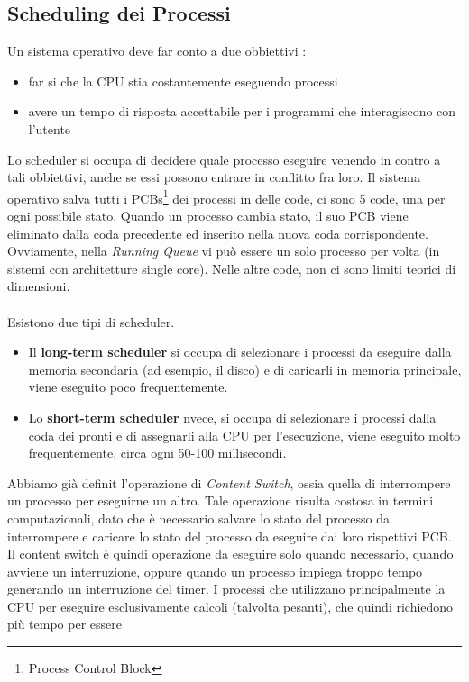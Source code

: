 \documentclass[12pt, letterpaper]{article}
\begin{document}
\subsection{Scheduling dei Processi}
Un sistema operativo deve far conto a due obbiettivi : \begin{itemize}
    \item far si che la CPU stia costantemente eseguendo processi 
    \item avere un tempo di risposta accettabile per i programmi che interagiscono con l'utente
\end{itemize}
Lo scheduler si occupa di decidere quale processo eseguire venendo in contro a tali obbiettivi, anche se 
essi possono entrare in conflitto fra loro. Il sistema operativo salva tutti i PCBs\footnote{
 Process Control Block
} dei processi in delle code, ci sono 5 code, una per ogni possibile stato. Quando un processo cambia stato, 
il suo PCB viene eliminato dalla coda precedente ed inserito nella nuova coda corrispondente. Ovviamente, 
nella \textit{Running Queue} vi può essere un solo processo per volta (in sistemi con architetture single core).
Nelle altre code, non ci sono limiti teorici di dimensioni.
\\\hphantom{}\\ 
Esistono due tipi di scheduler.\begin{itemize}
    \item Il \textbf{long-term scheduler} si occupa di selezionare i processi da eseguire dalla memoria secondaria 
    (ad esempio, il disco) e di caricarli in memoria principale, viene eseguito poco frequentemente.
    \item Lo \textbf{short-term scheduler} nvece, si occupa di selezionare i
     processi dalla coda dei pronti e di assegnarli alla CPU per l'esecuzione, viene eseguito molto frequentemente,
     circa ogni 50-100 millisecondi.
\end{itemize}
Abbiamo già definit l'operazione di \textit{Content Switch}, ossia quella di interrompere un processo per 
eseguirne un altro. Tale operazione risulta costosa in termini computazionali, dato che è necessario salvare 
lo stato del processo da interrompere e caricare lo stato del processo da eseguire dai loro rispettivi 
PCB. Il content switch è quindi operazione da eseguire solo quando necessario, quando avviene un interruzione, oppure 
quando un processo impiega troppo tempo generando un interruzione del timer. I processi che utilizzano principalmente 
la CPU per eseguire esclusivamente calcoli (talvolta pesanti), che quindi richiedono più tempo per essere 
\end{document}
